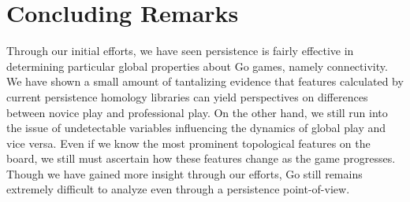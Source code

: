 \documentclass[11pt]{article}
\begin{document}
\section{Concluding Remarks}
Through our initial efforts, we have seen persistence is fairly effective in determining particular global properties about Go games, namely connectivity. We have shown a small amount of tantalizing evidence that features calculated by current persistence homology libraries can yield perspectives on differences between novice play and professional play. On the other hand, we still run into the issue of undetectable variables influencing the dynamics of global play and vice versa. Even if we know the most prominent topological features on the board, we still must ascertain how these features change as the game progresses. Though we have gained more insight through our efforts, Go still remains extremely difficult to analyze even through a persistence point-of-view.



\end{document}

